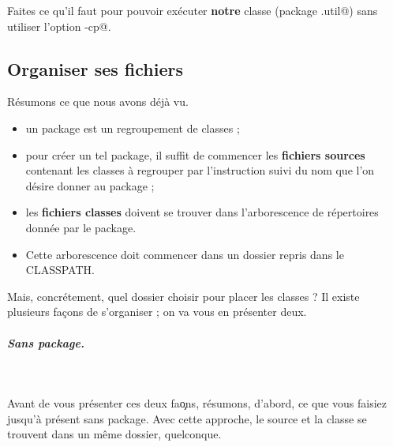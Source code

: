 \documentclass[a4paper,11pt]{article}
\begin{document}
		\begin{Exercice}{} 
			Faites ce qu'il faut pour pouvoir ex\'ecuter \textbf{notre} classe \verb@Color@
			(package \verb@esi.util@) sans utiliser l'option \verb@-cp@.
		\end{Exercice}
			
           	 \par
	 \subsection{Organiser ses fichiers}
		R\'esumons ce que  nous avons d\'ej\`a vu.
			
            	\par
        
		\begin{itemize}
				
			\item un package est un regroupement de classes ;
				
			\item pour cr\'eer un tel package, il suffit de commencer les 
				\textbf{fichiers sources} contenant les classes \`a regrouper
				par l'instruction \verb@package@ suivi du nom que l'on d\'esire donner au package ;
				
			\item les \textbf{fichiers classes} doivent se trouver dans l'arborescence de r\'epertoires 
					donn\'ee par le package.
				
			\item Cette arborescence doit commencer dans un dossier
				repris dans le CLASSPATH.
				
		\end{itemize}
				
		Mais, concr\'etement, quel dossier choisir pour placer les classes ?
		Il existe plusieurs fa\c cons de s'organiser ; on va vous en pr\'esenter deux. 
			
            \par
        
			
		\subparagraph{Sans package.} 
		
					\textcolor{white}{.} \par
				
			Avant de vous présenter ces deux fa\c ons, r\'esumons, d'abord, ce que vous faisiez jusqu'\`a pr\'esent sans package.
			Avec cette approche, le source et la classe se trouvent dans un m\^eme dossier, quelconque.
			
\end{document}
